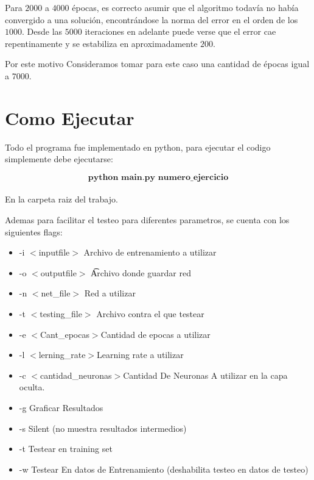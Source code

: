 Para $2000$ a $4000$ épocas, es correcto asumir que el algoritmo todavía no había convergido a una solución, encontrándose la norma del error en el orden de los $1000$. Desde las $5000$ iteraciones en adelante puede verse que el error cae repentinamente y se estabiliza en aproximadamente $200$.  

Por este motivo Consideramos tomar para este caso una cantidad de épocas igual a $7000$.

\pagebreak

\section{Como Ejecutar}

Todo el programa fue implementado en python, para ejecutar el codigo simplemente debe ejecutarse:

$$ \textbf{python main.py numero\_ejercicio} $$
\\
En la carpeta raiz del trabajo.

Ademas para facilitar el testeo para diferentes parametros, se cuenta con los siguientes flags:
\begin{itemize}
\item    -i $<$inputfile$>$ \quad Archivo de entrenamiento a utilizar
\item    -o $<$outputfile$>$ \t Archivo donde guardar red
\item    -n $<$net\_file$>$ \quad Red a utilizar
\item    -t $<$testing\_file$>$ \quad Archivo contra el que testear
\item    -e $<$Cant\_epocas$>$\quad Cantidad de epocas a utilizar
\item    -l $<$lerning\_rate$>$\quad Learning rate a utilizar
\item    -c $<$cantidad\_neuronas$>$\quad Cantidad De Neuronas A utilizar en la capa oculta.
\item    -g \quad Graficar Resultados
\item    -s \quad Silent (no muestra resultados intermedios)
\item    -t \quad Testear en training set
\item    -w \quad Testear En datos de Entrenamiento (deshabilita testeo en datos de testeo)
\end{itemize}